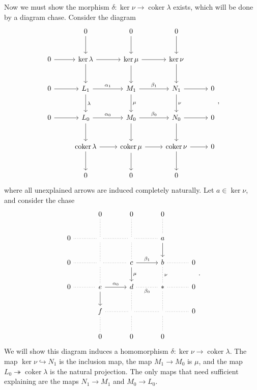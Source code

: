 \documentclass[11pt, letterpaper]{article}
\DeclareMathOperator{\coker}{coker}
\renewenvironment{proof}[1][]{\begin{replacementproof2}}{\end{replacementproof2}}
\begin{document}
\begin{proof}
Now we must show the morphism $\delta : \ker \nu  \to \coker \lambda $ exists, which will be done by a diagram chase. Consider the diagram
\begin{equation}\label{eq:1}
	\begin{tikzcd}[row sep = 2.5em, column sep = 2.5em]
	&0\arrow[d]&0\arrow[d]&0\arrow[d]\\
	0\arrow[r]&\ker \lambda\arrow[r]\arrow[d]&\ker \mu \arrow[r]\arrow[d]&\ker \nu \arrow[d]\\
	0\arrow[r]&L_1\arrow[r, "\alpha_1"]\arrow[d, "\lambda "]&M_1\arrow[r, "\beta_1"]\arrow[d, "\mu "]&N_1\arrow[r]\arrow[d, "\nu "]&0\\
	0\arrow[r]&L_0\arrow[r, "\alpha _0"]\arrow[d]&M_0\arrow[r, "\beta _0"]\arrow[d]&N_0\arrow[r]\arrow[d]&0\\
		  &\coker \lambda \arrow[r]\arrow[d]&\coker \mu \arrow[r]\arrow[d]&\coker \nu \arrow[r]\arrow[d]&0\\
		  &0&0&0
\end{tikzcd},\end{equation}
where all unexplained arrows are induced completely naturally. Let $a\in \ker \nu $, and consider the chase
\begin{equation}\label{eq:2}
\begin{tikzcd}[row sep=2em, column sep=3em]
	&0\arrow[d, dotted, no head]&0\arrow[d, dotted, no head]&0\arrow[d, dotted, no head]\\
	0\arrow[r, dotted, no head]&\arrow[r, dotted, no head]\arrow[d, dotted, no head]&\arrow[d,  dotted, no head]\arrow[r, dotted, no head]&a\arrow[d]\\
	0\arrow[r, dotted, no head]&\arrow[r, dotted, no head]\arrow[d, dotted, no head]&c\arrow[r, "\beta _1"]\arrow[d, "\mu "]&b\arrow[r, dotted, no head]\arrow[d, dotted, no head, "\nu "]&0\\
	0\arrow[r, dotted, no head]&e\arrow[r, "\alpha _0"]\arrow[d]&d\arrow[d, dotted, no head]\arrow[r, dotted, no head, "\beta _0"']&*\arrow[r, dotted, no head]\arrow[d, dotted, no head]&0\\
				   &f\arrow[r, dotted, no head]\arrow[d, dotted, no head]&\arrow[r, dotted, no head]\arrow[d, dotted, no head]&\arrow[r, dotted, no head]\arrow[d, dotted, no head]&0\\
				   &0&0&0
\end{tikzcd}.
\end{equation}
We will show this diagram induces a homomorphism $\delta : \ker \nu  \to \coker \lambda $. The map $\ker \nu \hookrightarrow N_1$ is the inclusion map, the map $M_1\to M_0$ is $\mu $, and the map $L_0\twoheadrightarrow \coker \lambda $ is the natural projection. The only maps that need sufficient explaining are the maps $N_1\to M_1 $ and $M_0\to L_0$.


\end{proof}
\end{document}
